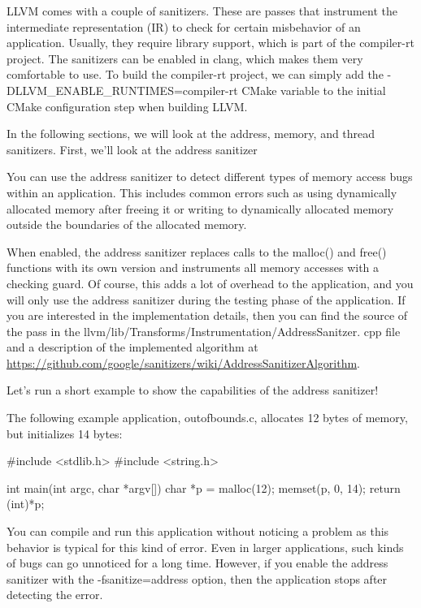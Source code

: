
LLVM comes with a couple of sanitizers. These are passes that instrument the intermediate representation (IR) to check for certain misbehavior of an application. Usually, they require library support, which is part of the compiler-rt project. The sanitizers can be enabled in clang, which makes them very comfortable to use. To build the compiler-rt project, we can simply add the -DLLVM\_ENABLE\_RUNTIMES=compiler-rt CMake variable to the initial CMake configuration step when building LLVM.

In the following sections, we will look at the address, memory, and thread sanitizers. First, we’ll look at the address sanitizer


You can use the address sanitizer to detect different types of memory access bugs within an application. This includes common errors such as using dynamically allocated memory after freeing it or writing to dynamically allocated memory outside the boundaries of the allocated memory.

When enabled, the address sanitizer replaces calls to the malloc() and free() functions with its own version and instruments all memory accesses with a checking guard. Of course, this adds a lot of overhead to the application, and you will only use the address sanitizer during the testing phase of the application. If you are interested in the implementation details, then you can find the source of the pass in the llvm/lib/Transforms/Instrumentation/AddressSanitzer. cpp file and a description of the implemented algorithm at \url{https://github.com/google/sanitizers/wiki/AddressSanitizerAlgorithm}.

Let’s run a short example to show the capabilities of the address sanitizer!

The following example application, outofbounds.c, allocates 12 bytes of memory, but initializes 14 bytes:

\begin{cpp}
#include <stdlib.h>
#include <string.h>

int main(int argc, char *argv[]) {
    char *p = malloc(12);
    memset(p, 0, 14);
    return (int)*p;
}
\end{cpp}

You can compile and run this application without noticing a problem as this behavior is typical for this kind of error. Even in larger applications, such kinds of bugs can go unnoticed for a long time. However, if you enable the address sanitizer with the -fsanitize=address option, then the application stops after detecting the error.

